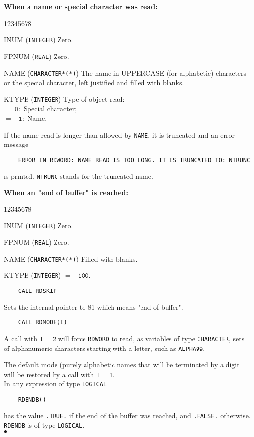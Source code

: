 \par
{\bf When a name or special character was read:}
\begin{DLtt}{12345678}
\item[INUM] ({\tt INTEGER}) Zero.
\item[FPNUM] ({\tt REAL}) Zero.
\item[NAME] ({\tt CHARACTER*(*)}) The name in UPPERCASE (for
alphabetic) characters or the special character, left justified and
filled with blanks.
\item[KTYPE] ({\tt INTEGER}) Type of object read: \\
$\mathtt{= \ 0:}$ Special character; \\
$\mathtt{= -1:}$ Name.
\end{DLtt}
If the name read is longer than allowed by {\tt NAME}, it is truncated
and an error message
\begin{verbatim}
    ERROR IN RDWORD: NAME READ IS TOO LONG. IT IS TRUNCATED TO: NTRUNC
\end{verbatim}
is printed. {\tt NTRUNC} stands for the truncated name.
\par
{\bf When an "end of buffer" is reached:}
\begin{DLtt}{12345678}
\item[INUM] ({\tt INTEGER}) Zero.
\item[FPNUM] ({\tt REAL}) Zero.
\item[NAME] ({\tt CHARACTER*(*)}) Filled with blanks.
\item[KTYPE] ({\tt INTEGER}) $\mathtt{= -100}$.
\end{DLtt}
\begin{verbatim}
    CALL RDSKIP
\end{verbatim}
Sets the internal pointer to 81 which means "end of buffer".
\begin{verbatim}
    CALL RDMODE(I)
\end{verbatim}
A call with $\mathtt{I=2}$ will force {\tt RDWORD} to read, as variables of
type {\tt CHARACTER}, sets of alphanumeric characters starting with a
letter, such as {\tt ALPHA99}.
\par
The default mode (purely alphabetic names that will be terminated by a
digit will be restored by a call with $\mathtt{I=1}$. \\
In any expression of type {\tt LOGICAL}
\begin{verbatim}
    RDENDB()
\end{verbatim}
has the value {\tt .TRUE.} if the end of the buffer was reached, and
{\tt .FALSE.} otherwise. {\tt RDENDB} is of type {\tt LOGICAL}.
\\ $\bullet$
